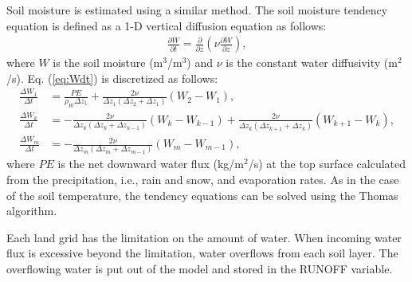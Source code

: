 Soil moisture is estimated using a similar method.
The soil moisture tendency equation is defined as a 1-D vertical diffusion equation as follows:
\begin{align}
  \frac{\partial W}{\partial t} = \frac{\partial}{\partial z} \left( \nu \frac{\partial W}{\partial z} \right),
  \label{eq:Wdt}
\end{align}
where $W$ is the soil moisture (m$^3$/m$^3$) and $\nu$ is the constant water diffusivity (m$^2$/s).
Eq. (\ref{eq:Wdt}) is discretized as follows:
\begin{align}
  \frac{\Delta W_{1}}{\Delta t} &= \frac{PE}{\rho_{W}\Delta z_{1}} + \frac{2\nu}{\Delta z_{1}(\Delta z_{2}+\Delta z_{1})} (W_{2}-W_{1}), \\
  \frac{\Delta W_{k}}{\Delta t} &= - \frac{2\nu}{\Delta z_{k}(\Delta z_{k}+\Delta z_{k-1})} (W_{k}-W_{k-1}) + \frac{2\nu}{\Delta z_{k}(\Delta z_{k+1}+\Delta z_{k})} (W_{k+1}-W_{k}), \\
  \frac{\Delta W_{m}}{\Delta t} &= - \frac{2\nu}{\Delta z_{m}(\Delta z_{m}+\Delta z_{m-1})} (W_{m}-W_{m-1}),
\end{align}
where $PE$ is the net downward water flux (kg/m$^2$/s) at the top surface calculated from the precipitation, i.e., rain and snow, and evaporation rates.
As in the case of the soil temperature, the tendency equations can be solved using the Thomas algorithm.

Each land grid has the limitation on the amount of water.
When incoming water flux is excessive beyond the limitation, water overflows from each soil layer.
The overflowing water is put out of the model and stored in the RUNOFF variable.
